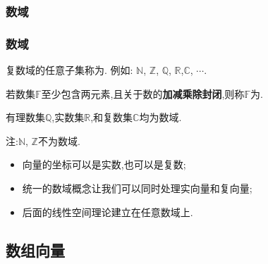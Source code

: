 \subsubsection{数域}
\begin{frame}\frametitle{数域}
复数域的任意子集称为. 例如: $\mathbb N$, $\mathbb Z$, $\mathbb Q$, $\mathbb R$,$\mathbb C$, $\cdots$.
\pp
\begin{definition} 若数集$\mathbb F$至少包含两元素,且关于数的{\bf 加减乘除封闭},则称$\mathbb F$为.
\end{definition}
\pp
\begin{example}[本课程中最常用的域]
有理数集$\mathbb Q$,实数集$\mathbb R$,和复数集$\mathbb C$均为数域.
\end{example}
注:$\mathbb N$, $\mathbb Z$不为数域.
\pp

\begin{itemize}
\item 向量的坐标可以是实数,也可以是复数;
\item 统一的数域概念让我们可以同时处理实向量和复向量;
\item 后面的线性空间理论建立在任意数域上.
\end{itemize}

\pp
{}
\end{frame}





\subsection{数组向量}


